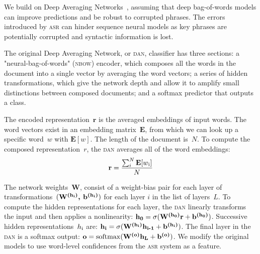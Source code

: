 We build on Deep Averaging Networks~\cite[\dan{}]{Iyyer:Manjunatha:Boyd-Graber:Daume-III-2015}, assuming
that deep bag-of-words models can improve predictions and be robust to
corrupted phrases.  The errors introduced by \textsc{asr} can hinder
sequence neural models as key phrases are potentially corrupted and
syntactic information is lost.










The original Deep Averaging Network, or \textsc{dan}, classifier has
three sections: a "neural-bag-of-words" (\textsc{nbow}) encoder, which
composes all the words in the document into a single vector by
averaging the word vectors; a series of hidden transformations, which
give the network depth and allow it to amplify small distinctions
between composed documents; and a softmax predictor that outputs a class.

The encoded representation~$\textbf{r}$ is the averaged embeddings of
input words. The word vectors exist in an embedding
matrix~$\textbf{E}$, from which we can look up a specific word~$w$
with $\textbf{E}[w]$. The length of the document is~$N$. To compute
the composed representation~$r$, the \textsc{dan} averages all of the
word embeddings:
\begin{equation}
\textbf{r} = \frac{\sum_{i}^{N}\textbf{E}[w\textsubscript{i}]}{N}
\end{equation}

The network weights~$\textbf{W}$, consist of a weight-bias pair for each layer of
transformations~$(\textbf{W\textsuperscript{(h\textsubscript{i})}, b\textsuperscript{(h\textsubscript{i})}})$ for each layer $i$ in the list of
layers~$L$. To compute the hidden representations for each layer, the
\textsc{dan}  linearly transforms the input and then applies a nonlinearity:
$
\textbf{h\textsubscript{0}} = \sigma (\textbf{W\textsuperscript{(h\textsubscript{0})}}\textbf{r}+\textbf{b\textsuperscript{(h\textsubscript{0})}})
$.
Successive hidden representations~$h\textsubscript{i}$ are:
$
\textbf{h\textsubscript{i}} = \sigma (\textbf{W\textsuperscript{(h\textsubscript{i})}}\textbf{h\textsubscript{i-1}}+\textbf{b\textsuperscript{(h\textsubscript{i})}})
$.
The final layer in the \textsc{dan} is a softmax output:
$
\textbf{o} = \mathrm{softmax}(\textbf{W\textsuperscript{(o)}}\textbf{h\textsubscript{L}} + \textbf{b\textsuperscript{(o)}})
$.
We modify the original \dan{} models to use word-level confidences from the \textsc{asr} system as a feature.  


